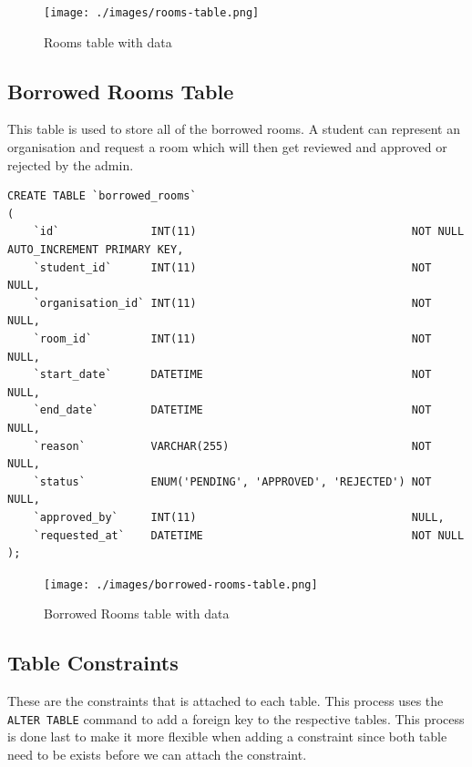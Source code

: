 \documentclass[12pt,titlepage]{article}
\begin{document}
\begin{figure}[h]
    \centering
    \texttt{[image: ./images/rooms-table.png]}
    \caption{Rooms table with data}
\end{figure}

\subsection{Borrowed Rooms Table}
This table is used to store all of the borrowed rooms. 
A student can represent an organisation and request a room which will then get reviewed and approved or rejected by the admin.

\begin{verbatim}
CREATE TABLE `borrowed_rooms`
(
    `id`              INT(11)                                 NOT NULL AUTO_INCREMENT PRIMARY KEY,
    `student_id`      INT(11)                                 NOT NULL,
    `organisation_id` INT(11)                                 NOT NULL,
    `room_id`         INT(11)                                 NOT NULL,
    `start_date`      DATETIME                                NOT NULL,
    `end_date`        DATETIME                                NOT NULL,
    `reason`          VARCHAR(255)                            NOT NULL,
    `status`          ENUM('PENDING', 'APPROVED', 'REJECTED') NOT NULL,
    `approved_by`     INT(11)                                 NULL,
    `requested_at`    DATETIME                                NOT NULL
);
\end{verbatim}

\pagebreak

\begin{figure}[h]
    \centering
    \texttt{[image: ./images/borrowed-rooms-table.png]}
    \caption{Borrowed Rooms table with data}
\end{figure}

\subsection{Table Constraints}
These are the constraints that is attached to each table. This process uses the \texttt{ALTER TABLE} command
to add a foreign key to the respective tables. This process is done last to make it more flexible when adding a constraint
since both table need to be exists before we can attach the constraint.
\end{document}
